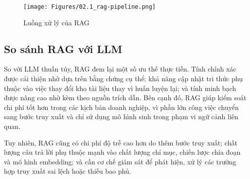 \begin{figure}[H]
    \centering
    \texttt{[image: Figures/02.1\_rag-pipeline.png]}
    \caption{Luồng xử lý của RAG}
    \label{fig:rag}
\end{figure}

\subsection{So sánh RAG với LLM}

So với LLM thuần túy, RAG đem lại một số ưu thế thực tiễn. Tính chính xác được cải thiện nhờ dựa trên bằng chứng cụ thể; khả năng cập nhật tri thức phụ thuộc vào việc thay đổi kho tài liệu thay vì huấn luyện lại; và tính minh bạch được nâng cao nhờ kèm theo nguồn trích dẫn. Bên cạnh đó, RAG giúp kiểm soát chi phí tốt hơn trong các kịch bản doanh nghiệp, vì phần lớn công việc chuyển sang bước truy xuất và chỉ sử dụng mô hình sinh trong phạm vi ngữ cảnh liên quan.

Tuy nhiên, RAG cũng có chi phí độ trễ cao hơn do thêm bước truy xuất; chất lượng câu trả lời phụ thuộc mạnh vào chất lượng chỉ mục, chiến lược chia đoạn và mô hình embedding; và cần cơ chế giám sát để phát hiện, xử lý các trường hợp truy xuất sai lệch hoặc thiếu bao phủ.
